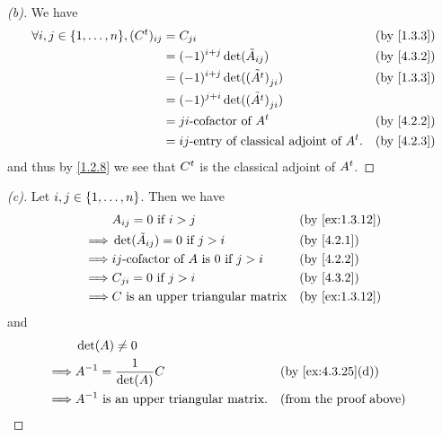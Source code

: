 \begin{proof}[(b)]
  We have
  \begin{align*}
    \forall i, j \in \set{1, \dots, n}, (\tp{C})_{i j} & = C_{j i}                                           &  & \by{1.3.3} \\
                                                       & = (-1)^{i + j} \det(\tilde{A}_{i j})                &  & \by{4.3.2} \\
                                                       & = (-1)^{i + j} \det(\tilde{(\tp{A})}_{j i})         &  & \by{1.3.3} \\
                                                       & = (-1)^{j + i} \det(\tilde{(\tp{A})}_{j i})                         \\
                                                       & = j i\text{-cofactor of } \tp{A}                    &  & \by{4.2.2} \\
                                                       & = i j\text{-entry of classical adjoint of } \tp{A}. &  & \by{4.2.3}
  \end{align*}
  and thus by \cref{1.2.8} we see that \({C}^{t}\) is the classical adjoint of \({A}^{t}\).
\end{proof}

\begin{proof}[(c)]
  Let \(i, j \in \left\lbrace1, \dots, n\right\rbrace\).
  Then we have
  \begin{align*}
             & A_{i j} = 0 \text{ if } i > j                             &  & \by{ex:1.3.12} \\
    \implies & \det(\tilde{A}_{i j}) = 0 \text{ if } j > i               &  & \by{4.2.1}     \\
    \implies & i j\text{-cofactor of } A \text{ is } 0 \text{ if } j > i &  & \by{4.2.2}     \\
    \implies & C_{j i} = 0 \text{ if } j > i                             &  & \by{4.3.2}     \\
    \implies & C \text{ is an upper triangular matrix}                   &  & \by{ex:1.3.12}
  \end{align*}
  and
  \begin{align*}
             & \det(A) \neq 0                                                                   \\
    \implies & A^{-1} = \frac{1}{\det(A)} C                  &  & \by{ex:4.3.25}[d]             \\
    \implies & A^{-1} \text{ is an upper triangular matrix}. &  & \text{(from the proof above)}
  \end{align*}
\end{proof}

